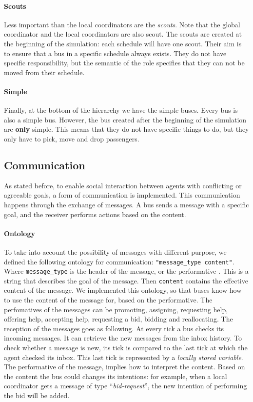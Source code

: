 \documentclass{article}
\begin{document}
\paragraph{Scouts}
Less important than the local coordinators are the \textit{scouts}. Note that the global coordinator and the local coordinators are also scout. The scouts are created at the beginning of the simulation: each schedule will have one scout. Their aim is to ensure that a bus in a specific schedule always exists. They do not have specific responsibility, but the semantic of the role specifies that they can not be moved from their schedule. 

\paragraph{Simple}
Finally, at the bottom of the hierarchy we have the simple buses. Every bus is also a simple bus. However, the bus created after the beginning of the simulation are \textbf{only} simple. This means that they do not have specific things to do, but they only have to pick, move and drop passengers. 

\subsection{Communication}
As stated before, to enable social interaction between agents with conflicting or agreeable goals, a form of communication is implemented. This communication happens through the exchange of messages. A bus sends a message with a specific goal, and the receiver performs actions based on the content.
\paragraph{Ontology}
To take into account the possibility of messages with different purpose, we defined the following ontology for communication: \texttt{"message\_type content"}. Where  \texttt{message\_type} is the header of the message, or the performative \cite{fipa}. This is a string that describes the goal of the message. Then \texttt{content} contains the effective content of the message. We implemented this ontology, so that buses know how to use the content of the message for, based on the performative. The perfomatives of the messages can be promoting, assigning, requesting help, offering help, accepting help, requesting a bid, bidding and reallocating. 
\newline
The reception of the messages goes as following. At every tick a bus checks its incoming messages. It can retrieve the new messages from the inbox history. To check whether a message is new, its tick is compared to the last tick at which the agent checked its inbox. This last tick is represented by a \textit{locally stored variable}. The performative of the message, implies how to interpret the content. Based on the content the bus could changes its intentions: for example, when a local coordinator gets a message of type ``\textit{bid-request}'', the new intention of performing the bid will be added.
\end{document}
